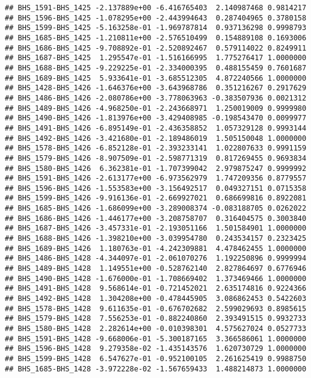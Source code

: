 \documentclass[]{article}
\begin{document}
\begin{verbatim}
## BHS_1591-BHS_1425 -2.137889e+00 -6.416765403  2.140987468 0.9814217
## BHS_1596-BHS_1425 -1.078295e+00 -2.443994643  0.287404965 0.3780158
## BHS_1599-BHS_1425 -5.163258e-01 -1.969787814  0.937136298 0.9998793
## BHS_1685-BHS_1425 -1.210811e+00 -2.576510499  0.154889108 0.1693006
## BHS_1686-BHS_1425 -9.708892e-01 -2.520892467  0.579114022 0.8249911
## BHS_1687-BHS_1425  1.295547e-01 -1.516166995  1.775276417 1.0000000
## BHS_1688-BHS_1425 -9.229225e-01 -2.334000395  0.488155459 0.7601687
## BHS_1689-BHS_1425  5.933641e-01 -3.685512305  4.872240566 1.0000000
## BHS_1428-BHS_1426 -1.646376e+00 -3.643968786  0.351216267 0.2917629
## BHS_1486-BHS_1426 -2.080786e+00 -3.778063963 -0.383507936 0.0021312
## BHS_1489-BHS_1426 -4.968250e-01 -2.243668971  1.250019009 0.9999980
## BHS_1490-BHS_1426 -1.813976e+00 -3.429408985 -0.198543470 0.0099977
## BHS_1491-BHS_1426 -6.895149e-01 -2.436358852  1.057329128 0.9993144
## BHS_1492-BHS_1426 -3.421680e-01 -2.189486019  1.505150048 1.0000000
## BHS_1578-BHS_1426 -6.852128e-01 -2.393233141  1.022807633 0.9991159
## BHS_1579-BHS_1426 -8.907509e-01 -2.598771319  0.817269455 0.9693834
## BHS_1580-BHS_1426  6.362381e-01 -1.707399042  2.979875247 0.9999992
## BHS_1591-BHS_1426 -2.613177e+00 -6.973562979  1.747209356 0.8779557
## BHS_1596-BHS_1426 -1.553583e+00 -3.156492517  0.049327151 0.0715358
## BHS_1599-BHS_1426 -9.916136e-01 -2.669927021  0.686699816 0.8922081
## BHS_1685-BHS_1426 -1.686099e+00 -3.289008374 -0.083188705 0.0262022
## BHS_1686-BHS_1426 -1.446177e+00 -3.208758707  0.316404575 0.3003840
## BHS_1687-BHS_1426 -3.457331e-01 -2.193051166  1.501584901 1.0000000
## BHS_1688-BHS_1426 -1.398210e+00 -3.039954780  0.243534157 0.2323425
## BHS_1689-BHS_1426  1.180763e-01 -4.242309881  4.478462455 1.0000000
## BHS_1486-BHS_1428 -4.344097e-01 -2.061070276  1.192250896 0.9999994
## BHS_1489-BHS_1428  1.149551e+00 -0.528762140  2.827864697 0.6776946
## BHS_1490-BHS_1428 -1.676000e-01 -1.708669402  1.373469466 1.0000000
## BHS_1491-BHS_1428  9.568614e-01 -0.721452021  2.635174816 0.9224366
## BHS_1492-BHS_1428  1.304208e+00 -0.478445905  3.086862453 0.5422603
## BHS_1578-BHS_1428  9.611635e-01 -0.676702682  2.599029693 0.8985615
## BHS_1579-BHS_1428  7.556253e-01 -0.882240860  2.393491515 0.9932733
## BHS_1580-BHS_1428  2.282614e+00 -0.010398301  4.575627024 0.0527733
## BHS_1591-BHS_1428 -9.668006e-01 -5.300187165  3.366586061 1.0000000
## BHS_1596-BHS_1428  9.279358e-02 -1.435143576  1.620730729 1.0000000
## BHS_1599-BHS_1428  6.547627e-01 -0.952100105  2.261625419 0.9988750
## BHS_1685-BHS_1428 -3.972228e-02 -1.567659433  1.488214873 1.0000000

\end{verbatim}
\end{document}
